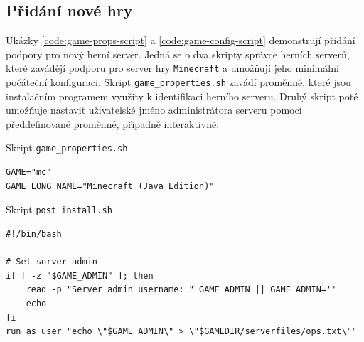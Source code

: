 \subsection{Přidání nové hry}

Ukázky \ref{code:game-props-script} a \ref{code:game-config-script} demonstrují přidání podpory pro nový herní server. Jedná se o dva skripty správce herních serverů,
které zavádějí podporu pro server hry \texttt{Minecraft} a umožňují jeho minimální počáteční konfiguraci.
Skript \texttt{game_properties.sh} zavádí proměnné, které jsou instalačním programem využity k identifikaci herního serveru.
Druhý skript poté umožňuje nastavit uživatelské jméno administrátora serveru pomocí předdefinované proměnné, případně interaktivně.

\begin{listing}[h]
    \caption{Skript \texttt{game_properties.sh}}
    \label{code:game-props-script}
    \begin{verbatim}
GAME="mc"
GAME_LONG_NAME="Minecraft (Java Edition)"
    \end{verbatim}
\end{listing}

\begin{listing}[h]
    \caption{Skript \texttt{post_install.sh}}
    \label{code:game-config-script}
    \begin{verbatim}
#!/bin/bash

# Set server admin
if [ -z "$GAME_ADMIN" ]; then
    read -p "Server admin username: " GAME_ADMIN || GAME_ADMIN=''
    echo
fi
run_as_user "echo \"$GAME_ADMIN\" > \"$GAMEDIR/serverfiles/ops.txt\""
    \end{verbatim}
\end{listing}
